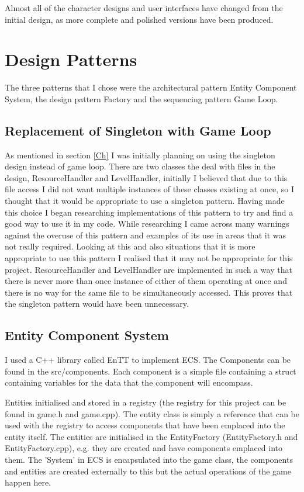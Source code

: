 \documentclass{article}
\begin{document}
Almost all of the character designs and user interfaces have changed from the initial design, as more complete and polished versions have been produced.

\section{Design Patterns} 
\label{DP}

The three patterns that I chose were the architectural pattern Entity Component System, the design pattern Factory and the sequencing pattern Game Loop. 

\subsection{Replacement of Singleton with Game Loop}

As mentioned in section \ref{Ch} I was initially planning on using the singleton design instead of game loop. 
There are two classes the deal with files in the design, ResourceHandler and LevelHandler, 
initially I believed that due to this file access I did not want multiple instances of these classes existing at once, so I thought that it would be appropriate to use a singleton pattern.
Having made this choice I began researching implementations of this pattern to try and find a good way to use it in my code.
While researching I came across many warnings against the overuse of this pattern and examples of its use in areas that it was not really required. 
Looking at this and also situations that it is more appropriate to use this pattern I realised that it may not be appropriate for this project.
ResourceHandler and LevelHandler are implemented in such a way that there is never more than once instance of either of them operating at once and there is no way for the same file to be simultaneously accessed.
This proves that the singleton pattern would have been unnecessary.

\subsection{Entity Component System}

I used a C++ library called EnTT to implement ECS.
The Components can be found in the  src/components.
Each component is a simple file containing a struct containing variables for the data that the component will encompass.

Entities initialised and stored in a registry (the registry for this project can be found in game.h and game.cpp).
The entity class is simply a reference that can be used with the registry to access components that have been emplaced into the entity itself.
The entities are initialised in the EntityFactory (EntityFactory.h and EntityFactory.cpp), e.g. they are created and have components emplaced into them.
The 'System' in ECS is encapsulated into the game class, the components and entities are created externally to this but the actual operations of the game happen here.
\end{document}

